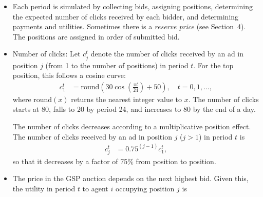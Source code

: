 \documentclass[11pt]{article}
\begin{document}
\begin{description}
\begin{itemize}
\item Each period is simulated by collecting bids, assigning positions,
  determining the expected number of clicks received by each bidder,
  and determining payments and utilities.  Sometimes there is a {\em
    reserve price} (see Section~4). The positions are assigned
in order of submitted bid. 
%
\item Number of clicks: Let $c_j^t$ denote the number of clicks
  received by an ad in position $j$ (from 1 to the number of
  positions) in period $t$. For the top position, this
  follows a cosine curve:
%
\begin{align}
 c_1^t &= \mbox{round}(30 \cos(\frac{\pi t}{24}) + 50),
\quad t = 0, 1, \ldots,
\end{align}
%
where $\mbox{round}(x)$ returns the nearest integer value to $x$. 
The number of clicks starts at 80, falls to 20 by period 24,
and  increases  to 80 by the end of a day.

The number of clicks decreases according to a multiplicative
position effect. The number of clicks received by an ad in
position $j$ ($j>1$) in period $t$ is
%
\begin{align}
c_j^t &= 0.75^{(j-1)}c_1^t,
\end{align}
%
so that it decreases by a factor of 75\% from  position to position.
%
\item The price in the GSP auction depends on the next highest bid.
Given this, the utility in period $t$ to
agent $i$ occupying position $j$ 
is 


\end{itemize}
\end{description}
\end{document}
